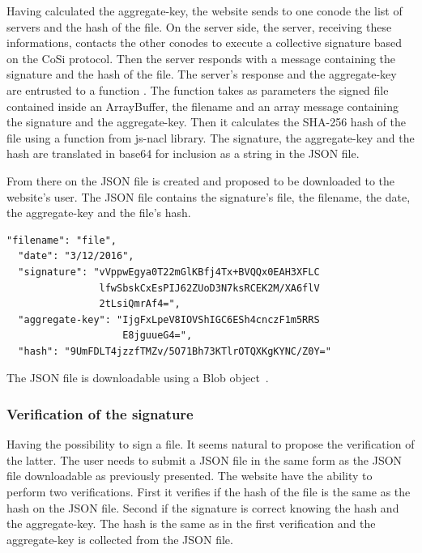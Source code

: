 \documentclass[11pt, a4paper, twoside, openright, openany]{article} %
\begin{document}
Having calculated the aggregate-key, the website sends to one conode the list of servers
and the hash of the file. On the server side, the server, receiving these informations,
contacts the other conodes to execute a collective signature based on the CoSi protocol.
Then the server responds with a message containing the signature
and the hash of the file. The server's response and the aggregate-key are entrusted to a function
.
\newline
The function takes as parameters the signed file contained inside an ArrayBuffer,
the filename and an array message containing the signature and the aggregate-key.
Then it calculates the SHA-256 hash of the file using a function from js-nacl library.
The signature, the aggregate-key and the hash are translated in base64 for inclusion
as a string in the JSON file.
\newline \newline

From there on the JSON file is created and proposed to be downloaded to the website's user.
The JSON file contains the signature's file, the filename, the date, the aggregate-key and the file's hash.
\bigbreak

\begin{lstlisting}[caption={Example a downloadable JSON file}, captionpos=b]
  "filename": "file",
  "date": "3/12/2016",
  "signature": "vVppwEgya0T22mGlKBfj4Tx+BVQQx0EAH3XFLC
                lfwSbskCxEsPIJ62ZUoD3N7ksRCEK2M/XA6flV
                2tLsiQmrAf4=",
  "aggregate-key": "IjgFxLpeV8IOVShIGC6ESh4cnczF1m5RRS
                    E8jguueG4=",
  "hash": "9UmFDLT4jzzfTMZv/5O71Bh73KTlrOTQXKgKYNC/Z0Y="
\end{lstlisting}

The JSON file is downloadable using a Blob object~\cite{blob}.
\bigbreak

\subsubsection{Verification of the signature}
Having the possibility to sign a file. It seems natural to propose the verification of the latter.
\newline
The user needs to submit a JSON file in the same form as the JSON file downloadable
as previously presented. The website have the ability to perform two verifications.
\newline
First it verifies if the hash of the file is the same as the hash on the JSON file. Second if the signature
is correct knowing the hash and the aggregate-key. The hash is the same as in the first verification
and the aggregate-key is collected from the JSON file.
\newline
\end{document}

